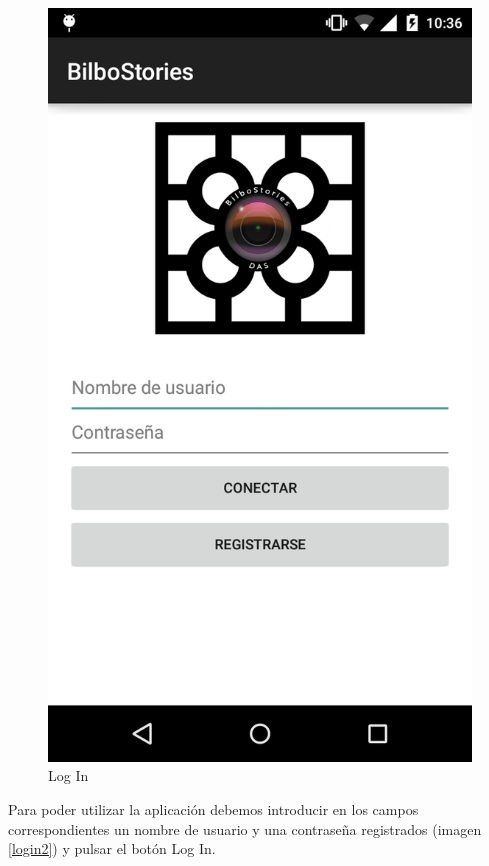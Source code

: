 \documentclass[11pt,a4paper, titlepage]{article}
\begin{document}
	\begin{figure}[!h]
		\centering
		\includegraphics[scale = 0.25 ]{img/0}
		\caption{Log In}
		\label{login1}
	\end{figure}
	
Para poder utilizar la aplicación debemos introducir en los campos correspondientes un nombre de usuario y una contraseña registrados (imagen \ref{login2}) y pulsar el botón Log In.
	
\end{document}
